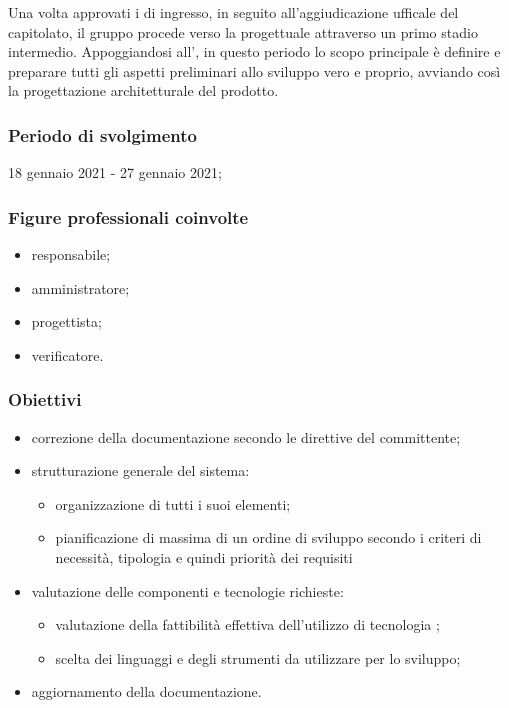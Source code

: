 Una volta approvati i  di ingresso, in seguito all'aggiudicazione ufficale del capitolato, il gruppo procede verso la  progettuale attraverso un primo stadio intermedio. Appoggiandosi all'\AdR{}, in questo periodo lo scopo principale è definire e preparare tutti gli aspetti preliminari allo sviluppo vero e proprio, avviando così la progettazione architetturale del prodotto.
        
        \subsubsection{Periodo di svolgimento}
        18 gennaio 2021 - 27 gennaio 2021;
        
        \subsubsection{Figure professionali coinvolte}
            \begin{itemize}
                \item responsabile;
                \item amministratore;
                \item progettista;
                \item verificatore.
            \end{itemize}

        \subsubsection{Obiettivi}
        \begin{itemize}
            \item correzione della documentazione secondo le direttive del committente;
            \item strutturazione generale del sistema:
            \begin{itemize}
                \item organizzazione di tutti i suoi elementi;
                \item pianificazione di massima di un ordine di sviluppo secondo i criteri di necessità, tipologia e quindi priorità dei requisiti
            \end{itemize}
            \item valutazione delle componenti e tecnologie richieste:
            \begin{itemize}
                \item valutazione della fattibilità effettiva dell'utilizzo di tecnologia ;
                \item scelta dei linguaggi e degli strumenti da utilizzare per lo sviluppo;
            \end{itemize}
            \item aggiornamento della documentazione.
        \end{itemize}